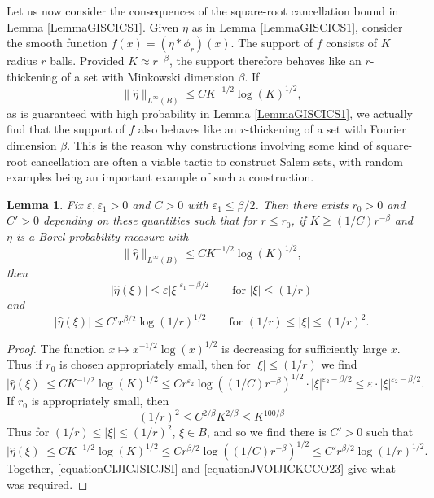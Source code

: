 \documentclass[12pt,reqno]{article}
\numberwithin{equation}{section}
\newtheorem{lemma}[theorem]{Lemma}
\numberwithin{theorem}{section}
\begin{document}
Let us now consider the consequences of the square-root cancellation bound in Lemma \ref{LemmaGISCICS1}. Given $\eta$ as in Lemma \ref{LemmaGISCICS1}, consider the smooth function $f(x) = (\eta * \phi_r)(x)$. The support of $f$ consists of $K$ radius $r$ balls. Provided $K \approx r^{-\beta}$, the support therefore behaves like an $r$-thickening of a set with Minkowski dimension $\beta$. If
%
\begin{equation}
    \| \widehat{\eta} \|_{L^\infty(B)} \leq C K^{-1/2} \log(K)^{1/2},
\end{equation}
%
as is guaranteed with high probability in Lemma \ref{LemmaGISCICS1}, we actually find that the support of $f$ also behaves like an $r$-thickening of a set with Fourier dimension $\beta$. This is the reason why constructions involving some kind of square-root cancellation are often a viable tactic to construct Salem sets, with random examples being an important example of such a construction.

\begin{lemma} \label{remarkGGIVJIS}
    Fix $\varepsilon,\varepsilon_1 > 0$ and $C > 0$ with $\varepsilon_1 \leq \beta/2$. Then there exists $r_0 > 0$ and $C' > 0$ depending on these quantities such that for $r \leq r_0$, if $K \geq (1/C) r^{-\beta}$ and $\eta$ is a Borel probability measure with
    \[ \| \widehat{\eta} \|_{L^\infty(B)} \leq C K^{-1/2} \log(K)^{1/2}, \]
    then
    \[ |\widehat{\eta}(\xi)| \leq \varepsilon |\xi|^{\varepsilon_1 - \beta/2} \quad\quad \text{for $|\xi| \leq (1/r)$} \]
    and
    \[ |\widehat{\eta}(\xi)| \leq C' r^{\beta/2} \log(1/r)^{1/2} \quad\quad \text{for $(1/r) \leq |\xi| \leq (1/r)^{2}$}. \]
\end{lemma}
\begin{proof}
    The function $x \mapsto x^{-1/2} \log(x)^{1/2}$ is decreasing for sufficiently large $x$. Thus if $r_0$ is chosen appropriately small, then for $|\xi| \leq (1/r)$ we find
    \begin{equation} \label{equationCIJICJSICJSI}
        |\widehat{\eta}(\xi)| \leq C K^{-1/2} \log(K)^{1/2} \leq C r^{\varepsilon_2} \log((1/C) r^{-\beta})^{1/2} \cdot |\xi|^{\varepsilon_2 - \beta/2} \leq \varepsilon \cdot |\xi|^{\varepsilon_2 - \beta/2}.
    \end{equation}
    If $r_0$ is appropriately small, then
    \[ (1/r)^2 \leq C^{2/\beta} K^{2/\beta} \leq K^{100/\beta} \]
    Thus for $(1/r) \leq |\xi| \leq (1/r)^2$, $\xi \in B$, and so we find there is $C' > 0$ such that
    \begin{equation} \label{equationJVOIJICKCCO23}
        |\widehat{\eta}(\xi)| \leq C K^{-1/2} \log(K)^{1/2} \leq C r^{\beta/2} \log((1/C) r^{-\beta})^{1/2} \leq C' r^{\beta/2} \log(1/r)^{1/2}.
    \end{equation}
    Together, \eqref{equationCIJICJSICJSI} and \eqref{equationJVOIJICKCCO23} give what was required.
\end{proof}
\end{document}
